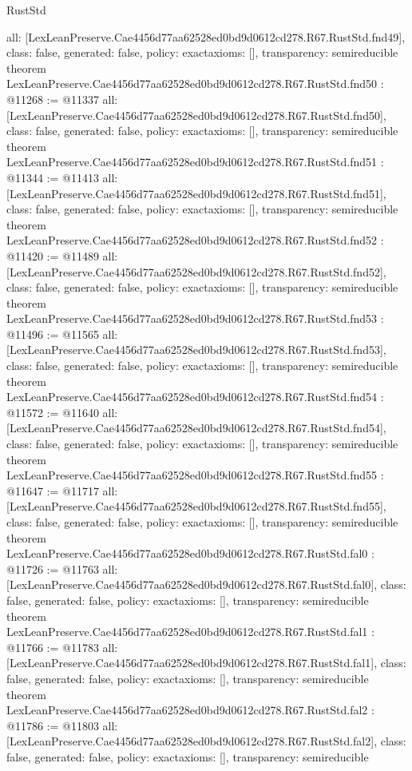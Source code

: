 \begin{lexlean}{RustStd}
\begin{coremodule}
{  all: [LexLeanPreserve.Cae4456d77aa62528ed0bd9d0612cd278.R67.RustStd.fnd49],
  class: false,
  generated: false,
  policy: exact{axioms: []},
  transparency: semireducible
}
theorem LexLeanPreserve.Cae4456d77aa62528ed0bd9d0612cd278.R67.RustStd.fnd50 : @11268 := @11337 {
  all: [LexLeanPreserve.Cae4456d77aa62528ed0bd9d0612cd278.R67.RustStd.fnd50],
  class: false,
  generated: false,
  policy: exact{axioms: []},
  transparency: semireducible
}
theorem LexLeanPreserve.Cae4456d77aa62528ed0bd9d0612cd278.R67.RustStd.fnd51 : @11344 := @11413 {
  all: [LexLeanPreserve.Cae4456d77aa62528ed0bd9d0612cd278.R67.RustStd.fnd51],
  class: false,
  generated: false,
  policy: exact{axioms: []},
  transparency: semireducible
}
theorem LexLeanPreserve.Cae4456d77aa62528ed0bd9d0612cd278.R67.RustStd.fnd52 : @11420 := @11489 {
  all: [LexLeanPreserve.Cae4456d77aa62528ed0bd9d0612cd278.R67.RustStd.fnd52],
  class: false,
  generated: false,
  policy: exact{axioms: []},
  transparency: semireducible
}
theorem LexLeanPreserve.Cae4456d77aa62528ed0bd9d0612cd278.R67.RustStd.fnd53 : @11496 := @11565 {
  all: [LexLeanPreserve.Cae4456d77aa62528ed0bd9d0612cd278.R67.RustStd.fnd53],
  class: false,
  generated: false,
  policy: exact{axioms: []},
  transparency: semireducible
}
theorem LexLeanPreserve.Cae4456d77aa62528ed0bd9d0612cd278.R67.RustStd.fnd54 : @11572 := @11640 {
  all: [LexLeanPreserve.Cae4456d77aa62528ed0bd9d0612cd278.R67.RustStd.fnd54],
  class: false,
  generated: false,
  policy: exact{axioms: []},
  transparency: semireducible
}
theorem LexLeanPreserve.Cae4456d77aa62528ed0bd9d0612cd278.R67.RustStd.fnd55 : @11647 := @11717 {
  all: [LexLeanPreserve.Cae4456d77aa62528ed0bd9d0612cd278.R67.RustStd.fnd55],
  class: false,
  generated: false,
  policy: exact{axioms: []},
  transparency: semireducible
}
theorem LexLeanPreserve.Cae4456d77aa62528ed0bd9d0612cd278.R67.RustStd.fal0 : @11726 := @11763 {
  all: [LexLeanPreserve.Cae4456d77aa62528ed0bd9d0612cd278.R67.RustStd.fal0],
  class: false,
  generated: false,
  policy: exact{axioms: []},
  transparency: semireducible
}
theorem LexLeanPreserve.Cae4456d77aa62528ed0bd9d0612cd278.R67.RustStd.fal1 : @11766 := @11783 {
  all: [LexLeanPreserve.Cae4456d77aa62528ed0bd9d0612cd278.R67.RustStd.fal1],
  class: false,
  generated: false,
  policy: exact{axioms: []},
  transparency: semireducible
}
theorem LexLeanPreserve.Cae4456d77aa62528ed0bd9d0612cd278.R67.RustStd.fal2 : @11786 := @11803 {
  all: [LexLeanPreserve.Cae4456d77aa62528ed0bd9d0612cd278.R67.RustStd.fal2],
  class: false,
  generated: false,
  policy: exact{axioms: []},
  transparency: semireducible
}
\end{coremodule}
\end{lexlean}
